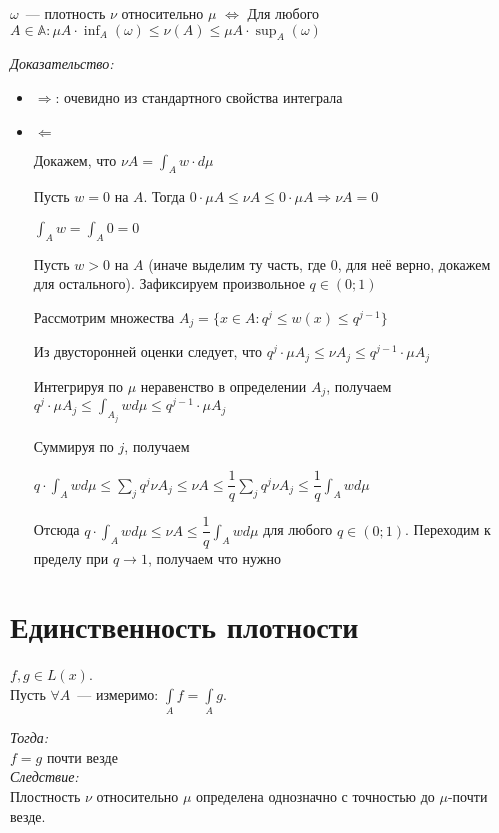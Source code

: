 \documentclass[paper=a4, fontsize=14pt]{report}
\begin{document}
	$\omega$~--- плотность $\nu$ относительно $\mu$ $\Longleftrightarrow$ Для любого $A\in\mathbb{A}:\mu A \cdot \inf_A(\omega) \leq \nu(A) \leq \mu A \cdot \sup_A(\omega)$
	
	
	\emph{Доказательство:}
	 	\begin{itemize}
	 		\item $\Rightarrow$: очевидно из стандартного свойства интеграла
	 		\item $\Leftarrow$\par
	 		Докажем, что $\nu A = \int_A w \cdot d \mu$
	 		
	 		Пусть $w = 0$ на $A$. Тогда $0 \cdot \mu A \leqslant \nu A \leqslant 0 \cdot \mu A \Rightarrow \nu A = 0$
	 		
	 		$\int_A w = \int_A 0 = 0$
	 		
	 		Пусть $w > 0$ на $A$ (иначе выделим ту часть, где 0, для неё верно, докажем для остального). Зафиксируем произвольное $q \in  (0; 1)$
	 		
	 		Рассмотрим множества $A_j = \{x \in A: q^j \leqslant w(x) \leqslant q^{j - 1}\}$
	 		
	 		Из двусторонней оценки следует, что $q^j \cdot \mu A_j \leqslant \nu A_j \leqslant q^{j - 1} \cdot \mu A_j$
	
			Интегрируя по $\mu$ неравенство в определении $A_j$, получаем \newline $q^j \cdot \mu A_j \leqslant \int_{A_j} w d \mu \leqslant q^{j - 1} \cdot \mu A_j$
			
			Суммируя по $j$, получаем
			
			$q \cdot \int_A w d \mu \leqslant \sum\limits_{j} q^j \nu A_j \leqslant \nu A \leqslant \dfrac{1}{q} \sum\limits_{j} q^j \nu A_j \leqslant \dfrac{1}{q} \int_A w d \mu$
			
			Отсюда $q \cdot \int_A w d \mu \leqslant \nu A \leqslant \dfrac{1}{q} \int_A w d \mu$ для любого $q \in (0; 1)$. Переходим к пределу при $q \rightarrow 1$, получаем что нужно
	 	\end{itemize}


\section{Единственность плотности}
	$f, g \in L(x)$. \\
	Пусть $\forall A$~--- измеримо: $\int\limits_A f = \int\limits_A g$.

	\emph{Тогда: } \\
		$f = g$ почти везде \\
	\emph{Следствие: } \\
		Плостность $\nu$ относительно $\mu$ определена однозначно с точностью до $\mu$-почти везде.
\end{document}
